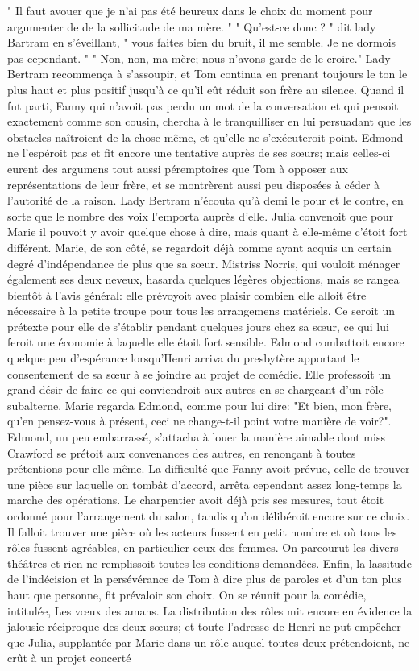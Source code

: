 " Il faut avouer que je n’ai pas été heureux dans le choix du moment pour argumenter de de la sollicitude de ma mère. "
" Qu’est-ce donc ? " dit lady Bartram en s’éveillant, " vous faites bien du bruit, il me semble. Je ne dormois pas cependant. "
" Non, non, ma mère; nous n’avons garde de le croire."\setcounter{page}{106} Lady Bertram recommença à s'assoupir, et Tom continua en prenant toujours le ton le plus haut et plus positif jusqu'à ce qu'il eût réduit son frère au silence. Quand il fut parti, Fanny qui n'avoit pas perdu un mot de la conversation et qui pensoit exactement comme son cousin, chercha à le tranquilliser en lui persuadant que les obstacles naîtroient de la chose même, et qu'elle ne s'exécuteroit point. Edmond ne l'espéroit pas et fit encore une tentative auprès de ses sœurs; mais celles-ci eurent des argumens tout aussi péremptoires que Tom à opposer aux représentations de leur frère, et se montrèrent aussi peu disposées à céder à l'autorité de la raison. Lady Bertram n'écouta qu'à demi le pour et le contre, en sorte que le nombre des voix l'emporta auprès d'elle. Julia convenoit que pour Marie il pouvoit y avoir quelque chose à dire, mais quant à elle-même c'étoit fort différent. Marie, de son côté, se regardoit déjà comme ayant acquis un certain degré d'indépendance de plus que sa sœur. Mistriss Norris, qui vouloit ménager également ses deux neveux, hasarda quelques légères objections, mais se rangea bientôt à l'avis général: elle prévoyoit avec plaisir combien elle alloit être nécessaire à la petite troupe pour tous les arrangemens\setcounter{page}{107} matériels. Ce seroit un prétexte pour elle de s'établir pendant quelques jours chez sa sœur, ce qui lui feroit une économie à laquelle elle étoit fort sensible. Edmond combattoit encore quelque peu d'espérance lorsqu'Henri arriva du presbytère apportant le consentement de sa sœur à se joindre au projet de comédie. Elle professoit un grand désir de faire ce qui conviendroit aux autres en se chargeant d'un rôle subalterne. Marie regarda Edmond, comme pour lui dire: "Et bien, mon frère, qu'en pensez-vous à présent, ceci ne change-t-il point votre manière de voir?". Edmond, un peu embarrassé, s'attacha à louer la manière aimable dont miss Crawford se prétoit aux convenances des autres, en renonçant à toutes prétentions pour elle-même. La difficulté que Fanny avoit prévue, celle de trouver une pièce sur laquelle on tombât d'accord, arrêta cependant assez long-temps la marche des opérations. Le charpentier avoit déjà pris ses mesures, tout étoit ordonné pour l'arrangement du salon, tandis qu'on délibéroit encore sur ce choix. Il falloit trouver une pièce où les acteurs fussent en petit nombre et où tous les rôles\setcounter{page}{108} fussent agréables, en particulier ceux des femmes. On parcourut les divers théâtres et rien ne remplissoit toutes les conditions demandées. Enfin, la lassitude de l'indécision et la persévérance de Tom à dire plus de paroles et d'un ton plus haut que personne, fit prévaloir son choix. On se réunit pour la comédie, intitulée, Les vœux des amans. La distribution des rôles mit encore en évidence la jalousie réciproque des deux sœurs; et toute l'adresse de Henri ne put empêcher que Julia, supplantée par Marie dans un rôle auquel toutes deux prétendoient, ne crût à un projet concerté 